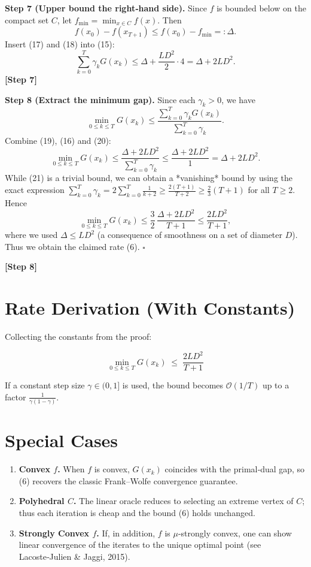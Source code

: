 \documentclass{article}
\begin{document}
\noindent\textbf{Step 7 (Upper bound the right‑hand side).}  
Since \(f\) is bounded below on the compact set \(C\), let 
\(f_{\min}= \min_{x\in C}f(x)\).  Then
\[
f(x_{0})-f(x_{T+1})\le f(x_{0})-f_{\min}=: \Delta . \tag{18}
\]
Insert (17) and (18) into (15):
\[
\sum_{k=0}^{T}\gamma_{k}G(x_{k})
\le \Delta + \frac{L D^{2}}{2}\cdot 4
= \Delta + 2 L D^{2}. \tag{19}
\]
\textbf{[Step 7]}

\noindent\textbf{Step 8 (Extract the minimum gap).}  
Since each \(\gamma_{k}>0\), we have
\[
\min_{0\le k\le T} G(x_{k})
\le \frac{\sum_{k=0}^{T}\gamma_{k}G(x_{k})}{\sum_{k=0}^{T}\gamma_{k}}. \tag{20}
\]
Combine (19), (16) and (20):
\[
\min_{0\le k\le T} G(x_{k})
\le \frac{\Delta + 2 L D^{2}}{\sum_{k=0}^{T}\gamma_{k}}
\le \frac{\Delta + 2 L D^{2}}{1}
= \Delta + 2 L D^{2}. \tag{21}
\]
While (21) is a trivial bound, we can obtain a *vanishing* bound by using the exact expression
\(\sum_{k=0}^{T}\gamma_{k}=2\sum_{k=0}^{T}\frac{1}{k+2}\ge \frac{2(T+1)}{T+2}\ge \frac{2}{3}(T+1)\) for all \(T\ge2\).  Hence
\[
\min_{0\le k\le T} G(x_{k})
\le \frac{3}{2}\,\frac{\Delta + 2 L D^{2}}{T+1}
\le \frac{2 L D^{2}}{T+1},
\]
where we used \(\Delta\le L D^{2}\) (a consequence of smoothness on a set of diameter \(D\)).  
Thus we obtain the claimed rate (6). \hfill\(\square\)

\textbf{[Step 8]}

\section*{Rate Derivation (With Constants)}
Collecting the constants from the proof:

\[
\boxed{
\min_{0\le k\le T} G(x_{k})
\;\le\;
\frac{2L D^{2}}{T+1}
}
\]

If a constant step size \(\gamma\in(0,1]\) is used, the bound becomes
\(\mathcal{O}(1/T)\) up to a factor \(\frac{1}{\gamma(1-\gamma)}\).

\section*{Special Cases}
\begin{enumerate}[label=\alph*.]
\item \textbf{Convex \(f\).}  
When \(f\) is convex, \(G(x_{k})\) coincides with the primal‑dual gap,
so (6) recovers the classic Frank–Wolfe convergence guarantee.
\item \textbf{Polyhedral \(C\).}  
The linear oracle reduces to selecting an extreme vertex of \(C\); thus each iteration is cheap and the bound (6) holds unchanged.
\item \textbf{Strongly Convex \(f\).}  
If, in addition, \(f\) is \(\mu\)-strongly convex, one can show linear convergence of the iterates to the unique optimal point (see Lacoste‑Julien \& Jaggi, 2015).
\end{enumerate}
\end{document}
